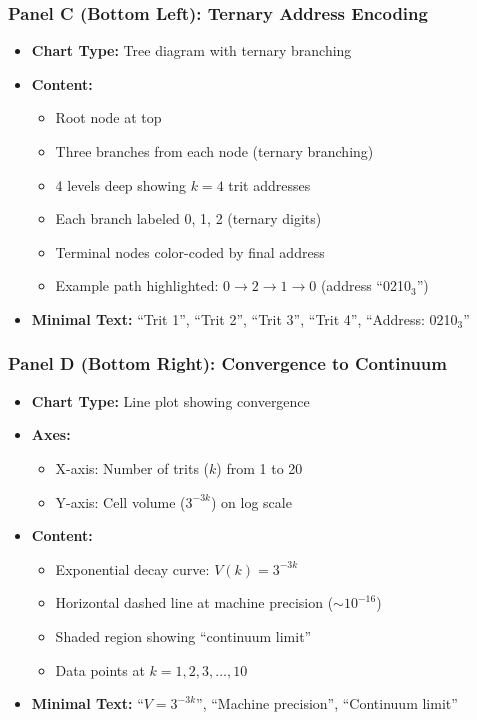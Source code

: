 \subsubsection*{Panel C (Bottom Left): Ternary Address Encoding}
\begin{itemize}
\item \textbf{Chart Type:} Tree diagram with ternary branching
\item \textbf{Content:}
  \begin{itemize}
  \item Root node at top
  \item Three branches from each node (ternary branching)
  \item 4 levels deep showing $k=4$ trit addresses
  \item Each branch labeled 0, 1, 2 (ternary digits)
  \item Terminal nodes color-coded by final address
  \item Example path highlighted: $0 \to 2 \to 1 \to 0$ (address ``0210$_3$'')
  \end{itemize}
\item \textbf{Minimal Text:} ``Trit 1'', ``Trit 2'', ``Trit 3'', ``Trit 4'', ``Address: 0210$_3$''
\end{itemize}

\subsubsection*{Panel D (Bottom Right): Convergence to Continuum}
\begin{itemize}
\item \textbf{Chart Type:} Line plot showing convergence
\item \textbf{Axes:}
  \begin{itemize}
  \item X-axis: Number of trits ($k$) from 1 to 20
  \item Y-axis: Cell volume ($3^{-3k}$) on log scale
  \end{itemize}
\item \textbf{Content:}
  \begin{itemize}
  \item Exponential decay curve: $V(k) = 3^{-3k}$
  \item Horizontal dashed line at machine precision ($\sim 10^{-16}$)
  \item Shaded region showing ``continuum limit''
  \item Data points at $k = 1,2,3,\ldots,10$
  \end{itemize}
\item \textbf{Minimal Text:} ``$V = 3^{-3k}$'', ``Machine precision'', ``Continuum limit''
\end{itemize}

